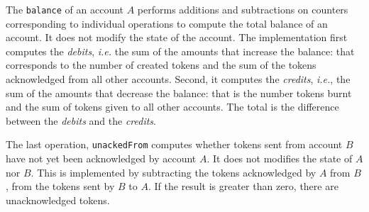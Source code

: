 \documentclass[9pt, oneside]{article}   	%
\begin{document}
The \texttt{balance} of an account $A$ performs additions and subtractions on counters corresponding to individual operations to compute the total balance of an account. It does not modify the state of the account. The implementation first computes the \textit{debits}, \textit{i.e.} the sum of the amounts that increase the balance: that corresponds to the number of created tokens and the sum of the tokens acknowledged from all other accounts. Second, it computes the \textit{credits}, \textit{i.e.}, the sum of the amounts that decrease the balance: that is the number tokens burnt and the sum of tokens given to all other accounts. The total is the difference between the \textit{debits} and the \textit{credits}.

The last operation, \texttt{unackedFrom} computes whether tokens sent from account $B$ have not yet been acknowledged by account $A$. It does not modifies the state of $A$ nor $B$. This is implemented by subtracting the tokens acknowledged by $A$ from $B$, from the tokens sent by $B$ to $A$. If the result is greater than zero, there are unacknowledged tokens.
\end{document}
